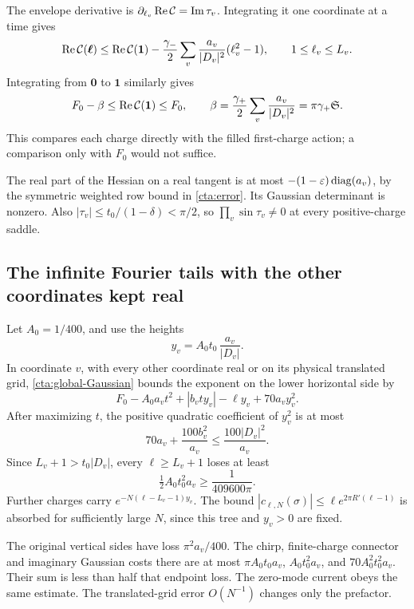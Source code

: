 The envelope derivative is
\(\partial_{\ell_v}\operatorname{Re}\mathcal C=\operatorname{Im}\tau_v\).
Integrating it one coordinate at a time gives
\begin{equation}\label{cta:charge-order}
 \operatorname{Re}\mathcal C(\boldsymbol\ell)\le\operatorname{Re}\mathcal C(\mathbf1)
   -\frac{\gamma_-}{2}\sum_v
       \frac{a_v}{|D_v|^2}(\ell_v^2-1),
 \qquad 1\le\ell_v\le L_v .
\end{equation}
Integrating from \(\mathbf0\) to \(\mathbf1\) similarly gives
\begin{equation}\label{cta:drop}
 F_0-\beta\le\operatorname{Re}\mathcal C(\mathbf1)\le F_0,\qquad
 \beta=\frac{\gamma_+}{2}\sum_v\frac{a_v}{|D_v|^2}
                         =\pi\gamma_+\mathfrak S.
\end{equation}
This compares each charge directly with the filled first-charge
action; a comparison only with \(F_0\) would not suffice.

The real part of the Hessian on a real tangent is at most
\(-(1-\varepsilon)\operatorname{diag}(a_v)\), by the symmetric weighted
row bound in \eqref{cta:error}. Its Gaussian determinant
is nonzero. Also
\(|\tau_v|\le t_0/(1-\delta)<\pi/2\), so
\(\prod_v\sin\tau_v\ne0\) at every positive-charge saddle.


\subsection{The infinite Fourier tails with the other coordinates kept real}\label{cta:Fourier}

Let \(A_0=1/400\), and use the heights
\begin{equation}\label{cta:height}
 y_v=A_0t_0\,\frac{a_v}{|D_v|}.
\end{equation}
In coordinate \(v\), with every other coordinate real or on its
physical translated grid, \eqref{cta:global-Gaussian} bounds
the exponent on the lower horizontal side by
\[
 F_0-A_0a_v t^2+|b_vty_v|-\ell y_v+70a_vy_v^2.
 \]
After maximizing \(t\), the positive quadratic coefficient
of \(y_v^2\) is at most
\[
 70a_v+\frac{100b_v^2}{a_v}
                  \le\frac{100|D_v|^2}{a_v}.
 \]
Since \(L_v+1>t_0|D_v|\), every \(\ell\ge L_v+1\) loses at least
\begin{equation}\label{cta:tail-loss}
 \tfrac12 A_0t_0^2a_v\ge\frac1{409600\pi}.
\end{equation}
Further charges carry \(e^{-N(\ell-L_v-1)y_v}\).
The bound
\(|c_{\ell,N}(\sigma)|\le
\ell e^{2\pi R'(\ell-1)}\) is absorbed for sufficiently large
\(N\), since this tree and \(y_v>0\) are fixed.

The original vertical sides have loss
\(\pi^2a_v/400\).
The chirp, finite-charge connector and imaginary Gaussian
costs there are at most
\(\pi A_0t_0a_v\), \(A_0t_0^2a_v\), and
\(70A_0^2t_0^2a_v\). Their sum is less than half that
endpoint loss. The zero-mode current obeys the same estimate.
The translated-grid error \(O(N^{-1})\) changes only the
prefactor.

